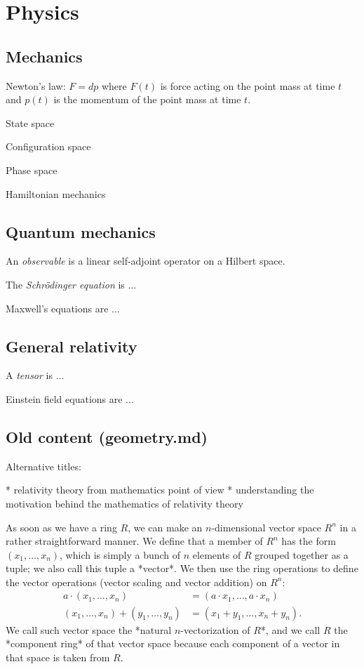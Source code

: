\chapter{Physics}

\section{Mechanics}

Newton's law:
\(F = dp\) where \(F(t)\) is force acting on the point mass at time \(t\)
and \(p(t)\) is the momentum of the point mass at time \(t\).

State space

Configuration space

Phase space

Hamiltonian mechanics

\section{Quantum mechanics}

%
An \emph{observable} is a linear self-adjoint operator on a Hilbert space.

%
The \emph{Schr\"odinger equation} is ...

%
Maxwell's equations are ...

\section{General relativity}

%
A \emph{tensor} is ...

%
Einstein field equations are ...

\section{Old content (geometry.md)}

Alternative titles:

* relativity theory from mathematics point of view
* understanding the motivation behind the mathematics of relativity theory

As soon as we have a ring $R$,
we can make an $n$-dimensional vector space $R^n$
in a rather straightforward manner.
We define that a member of $R^n$ has the form
$(x_1,\ldots,x_n)$,
which is simply a bunch of $n$ elements of $R$
grouped together as a tuple; we also call this tuple a *vector*.
We then use the ring operations to
define the vector operations (vector scaling and vector addition) on $R^n$:
\begin{align*}
a \cdot (x_1,\ldots,x_n) &= (a \cdot x_1,\ldots,a \cdot x_n)
\\ (x_1,\ldots,x_n) + (y_1,\ldots,y_n) &= (x_1+y_1,\ldots,x_n+y_n).
\end{align*}
We call such vector space the *natural $n$-vectorization of $R$*,
and we call $R$ the *component ring* of that vector space
because each component of a vector in that space is taken from $R$.

